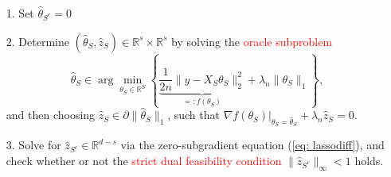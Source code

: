 \documentclass[10pt,handout,english]{beamer}
\newcommand{\R}{\mathbb{R}}
\begin{document}
\begin{frame}
\begin{theorem}
\begin{itemize}
\item[1.] Set $\hat{\theta}_{S^c}=0$\justifying
\item[2.] Determine $(\hat{\theta}_S,\hat{z}_S)\in\R^s\times\R^s$ by solving the \textcolor{red}{oracle subproblem}\justifying
\begin{equation}\label{eq: oraclesubproblem}
\hat{\theta}_S\in \arg\min_{\theta_S\in\R^S}\left\{\underbrace{\frac{1}{2n}\lVert y-X_S \theta_S\rVert_2^2}_{=:f(\theta_S)}+\lambda_n\lVert\theta_S\rVert_1\right\},
\end{equation}
and then choosing $\hat{z}_S\in\partial\lVert\hat{\theta}_S\rVert_1$, such that $\nabla f(\theta_S)\Bigg\vert_{\theta_S=\hat{\theta}_S}+\lambda_n\hat{z}_S=0$.
\item[3.] Solve for $\hat{z}_{S^c}\in\R^{d-s}$ via the zero-subgradient equation (\ref{eq: lassodiff}), and check whether or not the \textcolor{red}{strict dual feasibility condition} $\lVert\hat{z}_{S^c}\rVert_\infty<1$ holds.\justifying
\end{itemize}
\end{theorem}
\end{frame}
\end{document}
